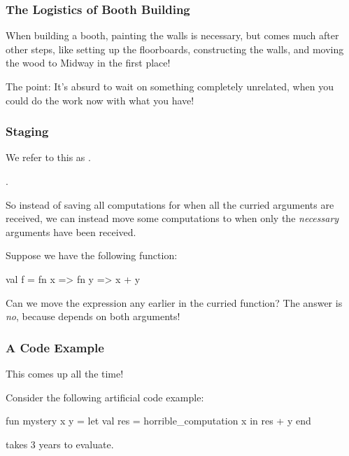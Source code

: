 \documentclass[aspectratio=169]{beamer}
\begin{document}
\begin{frame}[fragile]
  \frametitle{The Logistics of Booth Building}

  When building a booth, painting the walls is necessary, but comes much after 
  other steps, like setting up the floorboards, constructing the walls, and 
  moving the wood to Midway in the first place! 

  The point: It's absurd to wait on something completely unrelated, when you
  could do the work now with what you have!
\end{frame}



\begin{frame}[fragile]
  \frametitle{Staging}

  We refer to this as .

  .

  So instead of saving all computations for when all the curried arguments are received,
  we can instead move some computations to when only the \textit{necessary} arguments
  have been received.

  Suppose we have the following function:
  \begin{codeblock}
    val f = fn x => fn y => x + y
  \end{codeblock}

  Can we move the expression  any earlier in the curried function? The 
  answer is \textit{no}, because  depends on both arguments!
\end{frame}

\begin{frame}[fragile]
  \frametitle{A Code Example}

  This comes up all the time!

  Consider the following artificial code example:

  \begin{codeblock}
    fun mystery x y =
      let
        val res = horrible_computation x
      in
        res + y
      end 
  \end{codeblock}

   takes 3 years to evaluate.
\end{frame}
\end{document}
